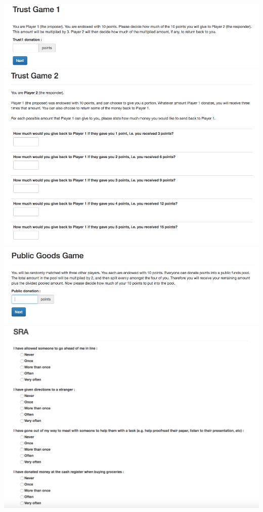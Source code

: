 \documentclass{article}
\begin{document}
\includegraphics[scale=0.5]{trust1} \\
\includegraphics[scale=0.5]{trust2} \\
\includegraphics[scale=0.5]{public} \\
\includegraphics[scale=0.5]{sra} \\
\end{document}

